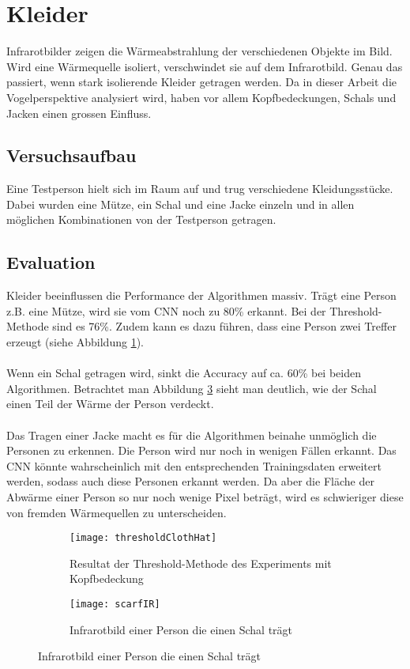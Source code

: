 \section{Kleider}
\label{sec:cloths}

Infrarotbilder zeigen die Wärmeabstrahlung der verschiedenen Objekte im Bild. Wird eine Wärmequelle isoliert, verschwindet sie auf dem Infrarotbild. Genau das passiert, wenn stark isolierende Kleider getragen werden. Da in dieser Arbeit die Vogelperspektive analysiert wird, haben vor allem Kopfbedeckungen, Schals und Jacken einen grossen Einfluss. 

\subsection{Versuchsaufbau}

Eine Testperson hielt sich im Raum auf und trug verschiedene Kleidungsstücke. Dabei wurden eine Mütze, ein Schal und eine Jacke einzeln und in allen möglichen Kombinationen von der Testperson getragen.

\subsection{Evaluation}
Kleider beeinflussen die Performance der Algorithmen massiv. Trägt eine Person z.B. eine Mütze, wird sie vom \gls{CNN} noch zu 80\% erkannt. Bei der Threshold-Methode sind es 76\%. Zudem kann es dazu führen, dass eine Person zwei Treffer erzeugt (siehe Abbildung \ref{fig:thresholdClothHat}).\\
\\
Wenn ein Schal getragen wird, sinkt die Accuracy auf ca. 60\% bei beiden Algorithmen. Betrachtet man Abbildung \ref{fig:scarfIR} sieht man deutlich, wie der Schal einen Teil der Wärme der Person verdeckt.\\
\\
Das Tragen einer Jacke macht es für die Algorithmen beinahe unmöglich die Personen zu erkennen. Die Person wird nur noch in wenigen Fällen erkannt. Das \gls{CNN} könnte wahrscheinlich mit den entsprechenden Trainingsdaten erweitert werden, sodass auch diese Personen erkannt werden. Da aber die Fläche der Abwärme einer Person so nur noch wenige Pixel beträgt, wird es schwieriger diese von fremden Wärmequellen zu unterscheiden.\\

\begin{figure}[H]
	\begin{subfigure}{.45\linewidth}
		\centering
		\texttt{[image: thresholdClothHat]}
		\caption{Resultat der Threshold-Methode des Experiments mit Kopfbedeckung}
		\label{fig:thresholdClothHat}
	\end{subfigure}
	\begin{subfigure}{.45\linewidth}
		\centering
		\texttt{[image: scarfIR]}
		\caption{Infrarotbild einer Person die einen Schal trägt}
		\label{fig:scarfIR}
	\end{subfigure}
	
\end{figure}

